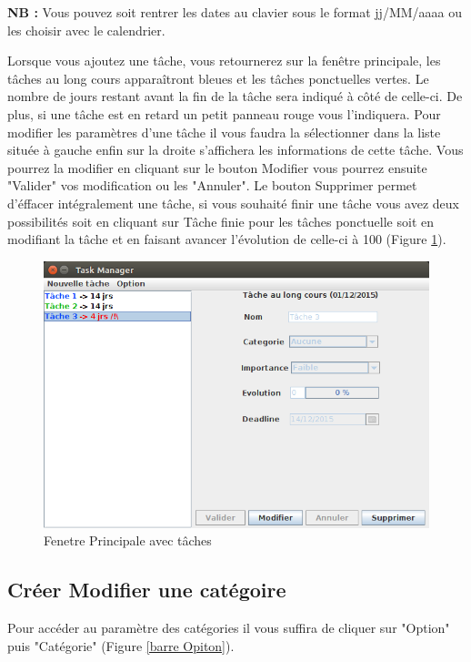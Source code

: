 \documentclass{article}
\begin{document}
\textbf{NB :} Vous pouvez soit rentrer les dates au clavier sous le format jj/MM/aaaa ou les choisir avec le calendrier.
\newline
\par
Lorsque vous ajoutez une tâche, vous retournerez sur la fenêtre principale, les tâches au long cours apparaîtront bleues et les tâches ponctuelles vertes. Le nombre de jours restant avant la fin de la tâche sera indiqué à côté de celle-ci.
De plus, si une tâche est en retard un petit panneau rouge vous l'indiquera.
Pour modifier les paramètres d'une tâche il vous faudra la sélectionner dans la liste située à gauche enfin sur la droite s'affichera les informations de cette tâche. Vous pourrez la modifier en cliquant sur le bouton Modifier vous pourrez ensuite "Valider" vos modification ou les "Annuler". Le bouton Supprimer permet d'éffacer intégralement une tâche, si vous souhaité finir une tâche vous avez deux possibilités soit en cliquant sur Tâche finie pour les tâches ponctuelle soit en modifiant la tâche et en faisant avancer l'évolution de celle-ci à 100%
(Figure \ref{Fenetre principale 2}).

\begin{figure}[!h]
	\centering
	\includegraphics[scale=0.34]{images/CaptureMainDIsplay3.png}
	\caption{Fenetre Principale avec tâches}
	\label{Fenetre principale 2}
\end{figure}

\clearpage
\subsection{Créer Modifier une catégoire}
Pour accéder au paramètre des catégories il vous suffira de cliquer sur "Option" puis "Catégorie" (Figure \ref{barre Opiton}).
\end{document}
